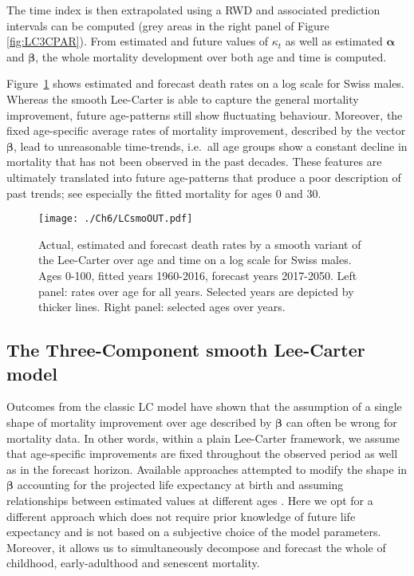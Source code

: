 \documentclass[Thesis]{subfiles}
\begin{document}
The time index is then extrapolated using a RWD and associated prediction intervals can be computed (grey areas in the right panel of Figure \ref{fig:LC3CPAR}). From estimated and future values of $\kappa_{t}$ as well as estimated $\bm{\alpha}$ and $\bm{\beta}$, the whole mortality development over both age and time is computed. 

Figure~\ref{fig:LCsmoOUT} shows estimated and forecast death rates on a log scale for Swiss males. Whereas the smooth Lee-Carter is able to capture the general mortality improvement, future age-patterns still show fluctuating behaviour. Moreover, the fixed age-specific average rates of mortality improvement, described by the vector $\bm{\beta}$, lead to unreasonable time-trends, i.e.~all age groups show a constant decline in mortality that has not been observed in the past decades. These features are ultimately translated into future age-patterns that produce a poor description of past trends; see especially the fitted mortality for ages 0 and 30.

\begin{figure}[!ht]\centering
	\texttt{[image: ./Ch6/LCsmoOUT.pdf]}
	\caption{\label{fig:LCsmoOUT} Actual, estimated and forecast death rates by a smooth variant of the Lee-Carter over age and time on a log scale for Swiss males. Ages 0-100, fitted years 1960-2016, forecast years 2017-2050. Left panel: rates over age for all years. Selected years are depicted by thicker lines. Right panel: selected ages over years.}  
\end{figure}

\subsection{The Three-Component smooth Lee-Carter model}\label{Subsec:Ch6subsec2.2}

Outcomes from the classic LC model have shown that the assumption of a single shape of mortality improvement over age described by $\bm{\beta}$ can often be wrong for mortality data. In other words, within a plain Lee-Carter framework, we assume that age-specific improvements are fixed throughout the observed period as well as in the forecast horizon. Available approaches  attempted to modify the shape in $\bm{\beta}$ accounting for the projected life expectancy at birth and assuming relationships between estimated values at different ages \citep{li2013extending, sevcikova2016agespecific}. Here we opt for a different approach which does not require prior knowledge of future life expectancy and is not based on a subjective choice of the model parameters. Moreover, it allows us to simultaneously decompose and forecast the whole of childhood, early-adulthood and senescent mortality. 
\end{document}
